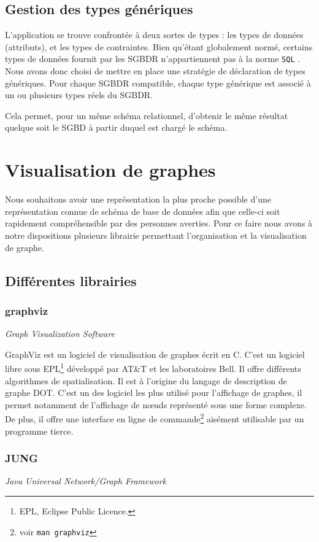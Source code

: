 	\subsection{Gestion des types génériques}
	\label{section:generic_types}
	L'application se trouve confrontée à deux sortes de types : les types de données (attributs), et les types de contraintes. Bien qu'étant globalement normé, certains types de données fournit par les SGBDR n'appartiennent pas à la norme \texttt{SQL} . Nous avons donc choisi de mettre en place une stratégie de déclaration de types génériques. Pour chaque SGBDR compatible, chaque type générique est associé à un ou plusieurs types réels du SGBDR.
	
	Cela permet, pour un même schéma relationnel, d'obtenir le même résultat quelque soit le SGBD à partir duquel est chargé le schéma.

\section{Visualisation de graphes}
	
	Nous souhaitons avoir une représentation la plus proche possible d'une représentation connue de schéma de base de données afin que celle-ci soit rapidement compréhensible par des personnes averties. Pour ce faire nous avons à notre dispositions plusieurs librairie permettant l'organisation et la visualisation de graphe.

  \subsection{Différentes librairies}
  	\subsubsection{graphviz} \textit{Graph Visualization Software}
  	
			GraphViz est un logiciel de visualisation de graphes écrit en C. C'est un logiciel libre sous EPL\footnote{EPL, Eclipse Public Licence.} développé par AT\&T et les laboratoires Bell. Il offre différents algorithmes de spatialisation. Il est à l'origine du langage de description de graphe DOT. C'est un des logiciel les plus utilisé pour l'affichage de graphes, il permet notamment de l'affichage de nœuds représenté sous une forme complexe. De plus, il offre une interface en ligne de commande\footnote{voir \texttt{man graphviz}} aisément utilisable par un programme tierce.
		\subsubsection{JUNG} \textit{Java Universal Network/Graph Framework}
		
